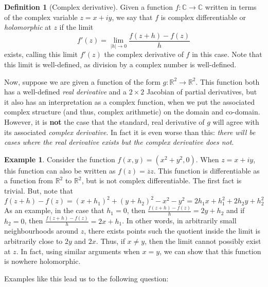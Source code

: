 \documentclass[aps,pra,showpacs,notitlepage,onecolumn,superscriptaddress,nofootinbib]{revtex4-1}
\theoremstyle{definition}
\newtheorem{definition}{Definition}[section]
\newtheorem{example}{Example}[section]
\begin{document}
\begin{definition}[Complex derivative]
  Given a function $f : \mathbb{C} \rightarrow \mathbb{C}$ written in terms of the complex variable $z = x + iy$, we say that $f$ is complex differentiable or \emph{holomorphic} at $z$ if the limit
  \begin{equation}
    \label{eq:complex_d}
    f'(z) = \lim_{|h| \to 0} \frac{f(z + h) - f(z)}{h}
  \end{equation}
  exists, calling this limit $f'(z)$ the complex derivative of $f$ in this case. Note that this limit is well-defined, as division by a complex number is well-defined.
\end{definition}

\noindent Now, suppose we are given a function of the form $g : \mathbb{R}^2 \rightarrow \mathbb{R}^2$. This function both has a well-defined \emph{real derivative} and a $2 \times 2$ Jacobian of partial
derivatives, but it also has an interpretation as a complex function, when we put the associated complex structure (and thus, complex arithmetic) on the domain and co-domain. However, it is \textbf{not} the
case that the standard, real derivative of $g$ will agree with its associated \emph{complex derivative}. In fact it is even worse than this: \emph{there will be cases where the real derivative exists but the complex derivative does not}.

\begin{example}
  Consider the function $f(x, y) = (x^2 + y^2, 0)$. When $z = x + iy$, this function can also be written as $f(z) = \overline{z} z$. This function is differentiable as a function from $\mathbb{R}^2$ to $\mathbb{R}^2$,
  but is not complex differentiable. The first fact is trivial. But, note that
  \begin{equation}
    f(z + h) - f(z) = (x + h_1)^2 + (y + h_2)^2 - x^2 - y^2 = 2h_1 x + h_1^2 + 2h_2 y + h_2^2
  \end{equation}
  As an example, in the case that $h_1 = 0$, then $\frac{f(z + h) - f(z)}{h} = 2 y + h_2$ and if $h_2 = 0$, then $\frac{f(z + h) - f(z)}{h} = 2 x + h_1$. In other words, in arbitrarily small neighbourhoods around $z$,
  there exists points such the quotient inside the limit is arbitrarily close to $2y$ and $2x$. Thus, if $x \neq y$, then the limit cannot possibly exist at $z$. In fact, using similar arguments when $x = y$, we can show that
  this function is nowhere holomorphic.
\end{example}

\noindent Examples like this lead us to the following question:
\end{document}
